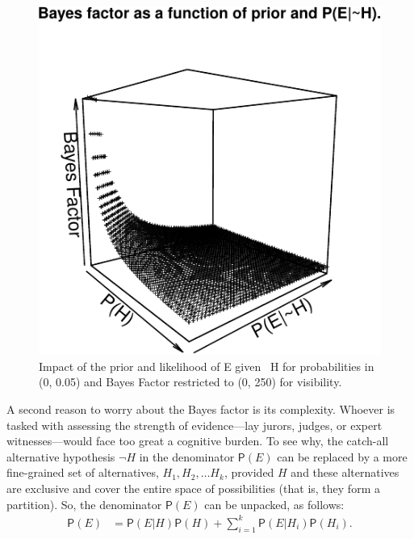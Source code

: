 \documentclass[
  10pt,
  dvipsnames,enabledeprecatedfontcommands]{scrartcl}
\newcommand{\pr}[1]{\mathsf{P}(#1)}
\begin{document}
\begin{figure}


\begin{center}\includegraphics[width=1\linewidth]{lr-chapter4_files/figure-latex/fig-BayesFactorPrior-1} \end{center}
\caption{Impact of the prior and likelihood of E given ~H for probabilities in (0, 0.05) and Bayes Factor restricted to (0, 250) for visibility.}
\label{fig:BayesFactorPrior}
\end{figure}

A second reason to worry about the Bayes factor is its complexity.
Whoever is tasked with assessing the strength of evidence---lay jurors,
judges, or expert witnesses---would face too great a cognitive burden.
To see why, the catch-all alternative hypothesis \(\neg H\) in the
denominator \(\pr{E}\) can be replaced by a more fine-grained set of
alternatives, \(H_1, H_2, \dots H_k\), provided \(H\) and these
alternatives are exclusive and cover the entire space of possibilities
(that is, they form a partition). So, the denominator \(\pr{E}\) can be
unpacked, as follows: \begin{align} \label{eq:lotpLong}
\pr{E} & = \pr{E\vert H}\pr{H} +\sum_{i=1}^k \pr{E\vert H_i}\pr{H_i}. 
\end{align}
\end{document}

